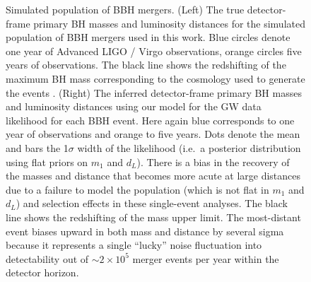 \documentclass[modern]{aastex62}
\begin{document}
\begin{figure}
%
  \caption{\label{fig:m1-dL} Simulated population of \ac{BBH} mergers.  (Left)
  The true detector-frame primary \ac{BH} masses and luminosity distances for
  the simulated population of \ac{BBH} mergers used in this work.  Blue circles
  denote one year of Advanced LIGO / Virgo observations, orange circles five
  years of observations. The black line shows the redshifting of the maximum
  \ac{BH} mass corresponding to the cosmology used to generate the events
  \citep[TT, TE, EE + lowP + lensing + ext]{Planck2016}.  (Right) The inferred
  detector-frame primary \ac{BH} masses and luminosity distances using our model
  for the \ac{GW} data likelihood for each \ac{BBH} event.  Here again blue
  corresponds to one year of observations and orange to five years.  Dots denote
  the mean and bars the 1$\sigma$ width of the likelihood (i.e.\ a posterior
  distribution using flat priors on $m_1$ and $d_L$).  There is a bias in the
  recovery of the masses and distance that becomes more acute at large distances
  due to a failure to model the population (which is not flat in $m_1$ and
  $d_L$) and selection effects in these single-event analyses.  The black line
  shows the redshifting of the mass upper limit.  The most-distant event biases
  upward in both mass and distance by several sigma because it represents a
  single ``lucky'' noise fluctuation into detectability out of $\sim 2 \times
  10^5$ merger events per year within the detector horizon.}
%
\end{figure}
\end{document}
